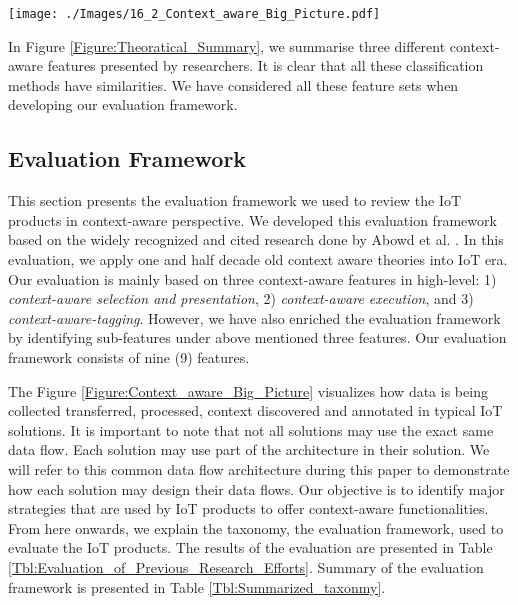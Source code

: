 \documentclass[journal]{IEEEtran}
\begin{document}
 
 
 
 
 
   \begin{figure*}[!t]
    \centering
\texttt{[image: ./Images/16\_2\_Context\_aware\_Big\_Picture.pdf]}
   \vspace{-0.33cm}	
    \caption{Data Flow in IoT Solutions in High-level. Context can be discovers in different stages / phases in the data flow. A typical IoT solution may use some part of the data flow architecture depending on the their intended functionalities.}
    \label{Figure:Context_aware_Big_Picture}	
   \vspace{-0.4cm}	
   \end{figure*}
  
 
 
 

 


 
  In Figure \ref{Figure:Theoratical_Summary}, we summarise three different context-aware features presented by  researchers. It is clear that all these classification methods have similarities. We have considered all these feature sets when developing our evaluation framework.
 
 
 
  \subsection{Evaluation Framework}
 
 
This section presents the evaluation framework we used to review the IoT products in context-aware perspective. We developed this evaluation framework based on the widely recognized and cited research done by Abowd et al. \cite{P104}.  In this evaluation, we apply one and half decade old context aware theories into IoT era. Our evaluation is mainly based on three context-aware features in high-level: 1)\textit{ context-aware selection and presentation}, 2) \textit{context-aware execution}, and 3) \textit{context-aware-tagging}.  However, we have also enriched the evaluation framework by identifying sub-features under above mentioned three features. Our evaluation framework consists of nine (9) features.


 



The  Figure \ref{Figure:Context_aware_Big_Picture} visualizes how data is being collected transferred, processed, context  discovered and annotated in typical IoT solutions. It is important to note that not all solutions may use the exact same data flow. Each solution may use part of the architecture in their solution. We will refer to this common data flow architecture during this paper to demonstrate how each solution may design their data flows. Our objective is to identify major strategies that are used by IoT products to offer context-aware functionalities. From here onwards, we explain the taxonomy, the evaluation framework, used to evaluate the IoT products. The results of the evaluation are presented in Table \ref{Tbl:Evaluation_of_Previous_Research_Efforts}. Summary of the evaluation framework is presented in Table \ref{Tbl:Summarized_taxonmy}.
 
\end{document}
